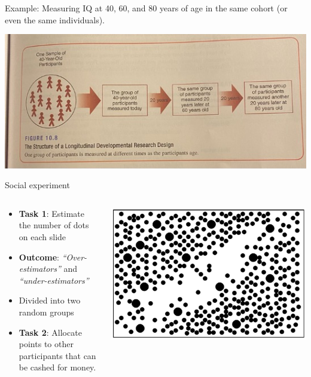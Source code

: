 \documentclass[
  ignorenonframetext,
  aspectratio=169,
]{beamer}
\providecommand{\tightlist}{%
  \setlength{\itemsep}{0pt}\setlength{\parskip}{0pt}}\usepackage{longtable,booktabs,array}
\begin{document}
\begin{frame}
Example: Measuring IQ at 40, 60, and 80 years of age in the same cohort
(or even the same individuals).

\begin{center}
\includegraphics{figs/iq.jpg}
\end{center}
\end{frame}

\begin{frame}{Social experiment}
\label{social-experiment}
\begin{columns}[c,totalwidth=8em]
\begin{column}{0.4\textwidth}
\begin{itemize}[<+->]
\tightlist
\item
  \textbf{Task 1}: Estimate the number of dots on each slide
\item
  \textbf{Outcome}: \emph{``Over-estimators''} and
  \emph{``under-estimators''}
\item
  Divided into two random groups
\item
  \textbf{Task 2}: Allocate points to other participants that can be
  cashed for money.
\end{itemize}
\end{column}

\begin{column}{0.6\textwidth}
\includegraphics{figs/tajfel.png}
\end{column}
\end{columns}
\end{frame}
\end{document}
